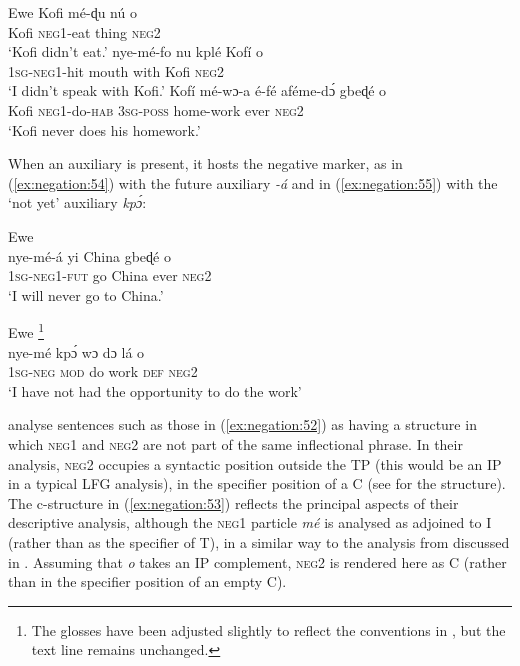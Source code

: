 \documentclass[output=paper,hidelinks]{langscibook}
\begin{document}
\ea\label{ex:negation:52} Ewe \citep[333--334, 361]{Collins:et:al:18}
\ea
\gll Kofi mé-ɖu nú o\\
Kofi \textsc{neg1}-eat thing \textsc{neg2}\\
\glt `Kofi didn’t eat.' 
\ex
\gll nye-mé-ƒo nu kplé Kofí o \\
\textsc{1sg-neg1}-hit mouth with Kofi \textsc{neg2}\\
\glt `I didn’t speak with Kofi.' 
\ex
\gll Kofí mé-wɔ-a é-ƒé aƒéme-dɔ́ gbeɖé o \\
Kofi \textsc{neg1-}do-\textsc{hab} \textsc{3sg-poss} home-work ever \textsc{neg2}\\
\glt `Kofi never does his homework.' 
\z\z

When an auxiliary is present, it hosts the negative marker, as in (\ref{ex:negation:54}) with the future auxiliary \emph{-á} and in (\ref{ex:negation:55}) with the `not yet' auxiliary \emph{kpɔ́}:
 
\newpage
\ea\label{ex:negation:54} Ewe \citep [360]{Collins:et:al:18}\\
\gll nye-mé-á yi China gbeɖé o\\
\textsc{1sg-neg1-fut} go China ever \textsc{neg2}\\
\glt ‘I will never go to China.’
\z

\ea
\label{ex:negation:55} Ewe \citep [50]{Ameka:91}\footnote{The glosses have been adjusted slightly to reflect the conventions in \citet {Collins:et:al:18}, but the text line remains unchanged.}\\
\gll nye-mé kpɔ́ wɔ dɔ lá o\\
\textsc{1sg-neg} \textsc{mod} do work \textsc{def} \textsc{neg2}\\
\glt ‘I have not had the opportunity to do the work’
\z

\citet {Collins:et:al:18} analyse sentences such as those in (\ref{ex:negation:52}) as having a structure in which \textsc{neg1} and \textsc{neg2} are not part of the same inflectional phrase. In their analysis, \textsc{neg2} occupies a syntactic position outside the TP (this would be an IP in a typical LFG analysis), in the specifier position of a C (see \citealt [293]{Collins:et:al:18} for the structure). The c-structure in (\ref{ex:negation:53}) reflects the principal aspects of their descriptive analysis, although the \textsc{neg1} particle \emph{mé} is analysed as adjoined to I (rather than as the specifier of T), in a similar way to the analysis from \citet {AlsharifSadler:09} discussed in . Assuming that \emph{o} takes an IP complement, \textsc{neg2} is rendered here as C (rather than in the specifier position of an empty C).
\end{document}
